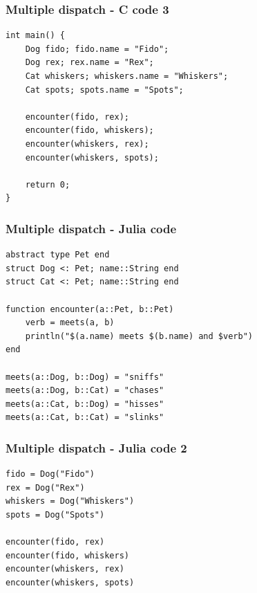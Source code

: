 \documentclass{beamer}
\begin{document}
\begin{frame}[fragile]
    \frametitle{Multiple dispatch - C code 3}

\begin{verbatim}
int main() {
    Dog fido; fido.name = "Fido";
    Dog rex; rex.name = "Rex";
    Cat whiskers; whiskers.name = "Whiskers";
    Cat spots; spots.name = "Spots";

    encounter(fido, rex);
    encounter(fido, whiskers);
    encounter(whiskers, rex);
    encounter(whiskers, spots);

    return 0;
}
\end{verbatim}

\end{frame}


\begin{frame}[fragile]
    \frametitle{Multiple dispatch - Julia code}

\begin{verbatim}
abstract type Pet end
struct Dog <: Pet; name::String end
struct Cat <: Pet; name::String end

function encounter(a::Pet, b::Pet)
    verb = meets(a, b)
    println("$(a.name) meets $(b.name) and $verb")
end

meets(a::Dog, b::Dog) = "sniffs"
meets(a::Dog, b::Cat) = "chases"
meets(a::Cat, b::Dog) = "hisses"
meets(a::Cat, b::Cat) = "slinks"
\end{verbatim}
\end{frame}


\begin{frame}[fragile]
    \frametitle{Multiple dispatch - Julia code 2}

\begin{verbatim}
fido = Dog("Fido")
rex = Dog("Rex")
whiskers = Dog("Whiskers")
spots = Dog("Spots")

encounter(fido, rex)
encounter(fido, whiskers)
encounter(whiskers, rex)
encounter(whiskers, spots)
\end{verbatim}
\end{frame}
\end{document}
